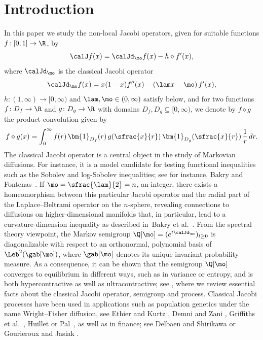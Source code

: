 \section{Introduction}

In this paper we study the non-local Jacobi operators, given for suitable functions $f \colon [0,1] \to \R$, by
\begin{equation}
\label{eq:defJ}
\calJ f(x) = \calJd_\mo f(x) - h \diamond f'(x),
\end{equation}
where $\calJd_\mo$ is the classical Jacobi operator
\begin{equation*}
\calJd_\mo f(x)= x (1-x)f''(x)-\left(\lam x-\mo\right)f'(x),
\end{equation*}
$h \colon (1,\infty) \to [0,\infty)$ and $\lam, \mo \in (0, \infty)$ satisfy  below,
and for two func\-tions $f \colon D_f \to \R$ and $g \colon D_g \to \R$ with domains $D_f, D_g \subseteq [0, \infty)$,
we denote by $f \diamond g$ the product convolution given by
\begin{equation}
\label{eq:defd}
f \diamond g(x) = \int_0^{\infty} f(r)\, \bm{1}_{D_f}(r)\, g(\sfrac{x}{r})\, \bm{1}_{D_g}(\sfrac{x}{r})\, \frac{1}{r}\, dr.
\end{equation}
The classical Jacobi operator is a central object in the study of Markovian diffusions. For instance, it is a model candidate for testing functional inequalities such as the Sobolev and log-Sobolev inequalities; see for instance, Bakry \cite{Bakry-Jacobi} and Fontenas~\cite{fontenas:1998}. If $\mo = \sfrac{\lam}{2} = n$, an integer, there exists a homeomorphism between this particular Jacobi operator and the radial part of the Laplace--Beltrami operator on the $n$-sphere, revealing connections to diffusions on higher-dimensional manifolds that, in particular, lead to a curvature-dimension inequality as described in~Bakry et al.~\cite[Chap.\,2.7]{Bakry_Book}. From the spectral theory viewpoint, the Markov semigroup $\Q[\mo] = (e^{t\calJd_\mo})_{t \geq 0}$ is diagonalizable with respect to an orthonormal, polynomial basis of $\Leb^2(\gab[\mo])$, where $\gab[\mo]$ denotes its unique invariant probability measure. As a consequence, it can be shown that the semigroup $\Q[\mo]$ converges to equilibrium in different ways, such as in variance or entropy, and is both hypercontractive as well as ultracontractive; see , where we review essential facts about the classical Jacobi operator, semigroup and process. Classical
Jacobi processes have been used in applications such as population genetics under the name Wright--Fisher diffusion, see \eg Ethier and Kurtz \cite[Chap.\,10]{EthierKurtz}, Demni and Zani \cite{dem}, Griffiths et al.~\cite{griffiths:2010,griffiths2018}, Huillet \cite{huillet2007wright} or Pal~\cite{pal2013},
as well as in finance; see \eg Delbaen and Shirikawa \cite{delbaen2002interest} or Gourieroux and Jasiak \cite{gourieroux2006}.

